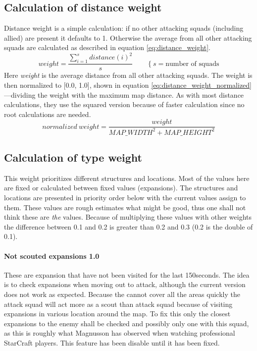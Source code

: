 \subsection{Calculation of distance weight}
Distance weight is a simple calculation: if no other attacking squads (including allied) are present it defaults to 1. Otherwise the average from all other attacking squads are calculated as described in equation \ref{eq:distance_weight}.
\begin{equation}
\label{eq:distance_weight}
weight = \frac{\sum_{i=1}^{s}{distance(i)^2}}{s} \qquad \left\{s = \text{number of squads}\right.
\end{equation}
Here \emph{weight} is the average distance from all other attacking squads. The weight is then normalized to [0.0, 1.0], shown in equation \ref{eq:distance_weight_normalized}—dividing the weight with the maximum map distance. As with most distance calculations, they use the squared version because of faster calculation since no root calculations are needed.
\begin{equation}
\label{eq:distance_weight_normalized}
normalized\ weight = \frac{weight}{MAP\_WIDTH^2 + MAP\_HEIGHT^2}
\end{equation}


\subsection{Calculation of type weight}
This weight prioritizes different structures and locations. Most of the values here are fixed or calculated between fixed values (expansions). The structures and locations are presented in priority order below with the current values assign to them. These values are rough estimates what might be good, thus one shall not think these are \emph{the} values. Because of multiplying these values with other weights the difference between 0.1 and 0.2 is greater than 0.2 and 0.3 (0.2 is the double of 0.1).

\paragraph{Not scouted expansions 1.0\conf}
These are expansion that have not been visited for the last 150\conf seconds. The idea is to check expansions when moving out to attack, although the current version does not work as expected. Because the  cannot cover all the areas quickly the attack squad will act more as a scout than attack squad because of visiting expansions in various location around the map. To fix this only the closest expansions to the enemy shall be checked and possibly only one with this squad, as this is roughly what Magnusson has observed when watching professional StarCraft players. This feature has been disable until it has been fixed.
	

